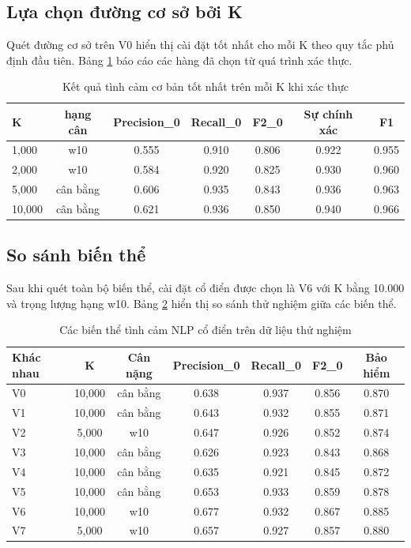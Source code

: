 \documentclass[12pt,a4paper]{article}
\begin{document}
\subsection{Lựa chọn đường cơ sở bởi K}
Quét đường cơ sở trên V0 hiển thị cài đặt tốt nhất cho mỗi K theo quy tắc phủ định đầu tiên. Bảng \ref{tab:nlp_chi2_best_per_k} báo cáo các hàng đã chọn từ quá trình xác thực.

\begin{table}[H]
\centering
\caption{Kết quả tình cảm cơ bản tốt nhất trên mỗi K khi xác thực}
\label{tab:nlp_chi2_best_per_k}
\begin{tabular}{lcccccc}
\toprule
K & hạng cân & Precision\_0 & Recall\_0 & F2\_0 & Sự chính xác & F1 \\
\midrule
1,000 & w10 & 0.555 & 0.910 & 0.806 & 0.922 & 0.955 \\
2,000 & w10 & 0.584 & 0.920 & 0.825 & 0.930 & 0.960 \\
5,000 & cân bằng & 0.606 & 0.935 & 0.843 & 0.936 & 0.963 \\
10,000 & cân bằng & 0.621 & 0.936 & 0.850 & 0.940 & 0.966 \\
\bottomrule
\end{tabular}
\end{table}

\subsection{So sánh biến thể}
Sau khi quét toàn bộ biến thể, cài đặt cổ điển được chọn là V6 với K bằng 10.000 và trọng lượng hạng w10. Bảng \ref{tab:nlp_variant_test} hiển thị so sánh thử nghiệm giữa các biến thể.

\begin{table}[H]
\centering
\caption{Các biến thể tình cảm NLP cổ điển trên dữ liệu thử nghiệm}
\label{tab:nlp_variant_test}
\begin{tabular}{lcccccc}
\toprule
Khác nhau & K & Cân nặng & Precision\_0 & Recall\_0 & F2\_0 & Bảo hiểm \\
\midrule
V0 & 10,000 & cân bằng & 0.638 & 0.937 & 0.856 & 0.870 \\
V1 & 10,000 & cân bằng & 0.643 & 0.932 & 0.855 & 0.871 \\
V2 & 5,000 & w10 & 0.647 & 0.926 & 0.852 & 0.874 \\
V3 & 10,000 & cân bằng & 0.626 & 0.923 & 0.843 & 0.868 \\
V4 & 10,000 & cân bằng & 0.635 & 0.921 & 0.845 & 0.872 \\
V5 & 10,000 & cân bằng & 0.653 & 0.933 & 0.859 & 0.878 \\
V6 & 10,000 & w10 & 0.677 & 0.932 & 0.867 & 0.885 \\
V7 & 5,000 & w10 & 0.657 & 0.927 & 0.857 & 0.880 \\
\bottomrule
\end{tabular}
\end{table}
\end{document}
